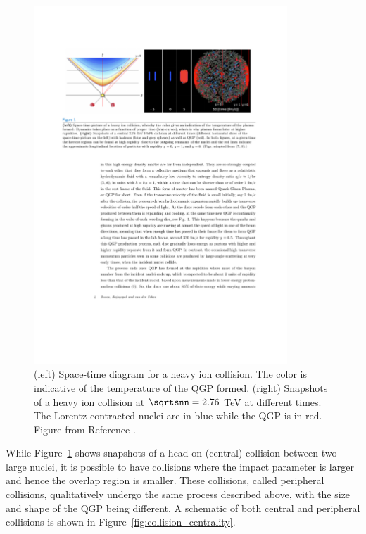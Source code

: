 \begin{figure}[htbp]
\begin{center}
\includegraphics[width=0.85\textwidth]{figures/theory/qgp_formation}
\caption{(left) Space-time diagram for a heavy ion collision.
The color is indicative of the temperature of the QGP formed.
(right) Snapshots of a heavy ion collision at $\sqrtsnn = 2.76$ TeV at different times.
The Lorentz contracted nuclei are in blue while the QGP is in red.
Figure from Reference \cite{Busza:2018rrf}.}
\label{fig:qgp_form}
\end{center}
\end{figure}

While Figure~\ref{fig:qgp_form} shows snapshots of a head on (central) collision between two large nuclei, it is possible to have collisions where the impact parameter is larger and hence the overlap region is smaller.
These collisions, called peripheral collisions, qualitatively undergo the same process described above, with the size and shape of the QGP being different.
A schematic of both central and peripheral collisions is shown in Figure~\ref{fig:collision_centrality}.

